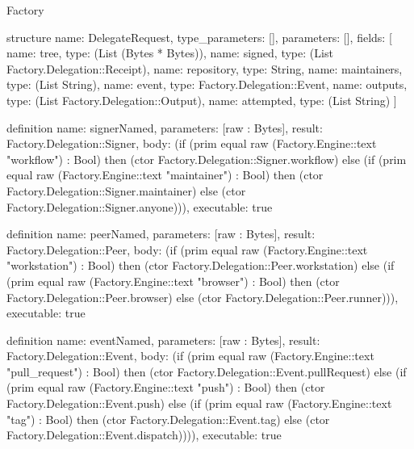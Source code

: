 \begin{lexlean}{Factory}
\begin{semanticmodule}
structure{
  name: DelegateRequest,
  type_parameters: [],
  parameters: [],
  fields: [
    {name: tree, type: (List (Bytes * Bytes))},
    {name: signed, type: (List Factory.Delegation::Receipt)},
    {name: repository, type: String},
    {name: maintainers, type: (List String)},
    {name: event, type: Factory.Delegation::Event},
    {name: outputs, type: (List Factory.Delegation::Output)},
    {name: attempted, type: (List String)}
  ]
}

definition{
  name: signerNamed,
  parameters: [raw : Bytes],
  result: Factory.Delegation::Signer,
  body: (if (prim equal raw (Factory.Engine::text "workflow") : Bool) then (ctor Factory.Delegation::Signer.workflow) else (if (prim equal raw (Factory.Engine::text "maintainer") : Bool) then (ctor Factory.Delegation::Signer.maintainer) else (ctor Factory.Delegation::Signer.anyone))),
  executable: true
}

definition{
  name: peerNamed,
  parameters: [raw : Bytes],
  result: Factory.Delegation::Peer,
  body: (if (prim equal raw (Factory.Engine::text "workstation") : Bool) then (ctor Factory.Delegation::Peer.workstation) else (if (prim equal raw (Factory.Engine::text "browser") : Bool) then (ctor Factory.Delegation::Peer.browser) else (ctor Factory.Delegation::Peer.runner))),
  executable: true
}

definition{
  name: eventNamed,
  parameters: [raw : Bytes],
  result: Factory.Delegation::Event,
  body: (if (prim equal raw (Factory.Engine::text "pull_request") : Bool) then (ctor Factory.Delegation::Event.pullRequest) else (if (prim equal raw (Factory.Engine::text "push") : Bool) then (ctor Factory.Delegation::Event.push) else (if (prim equal raw (Factory.Engine::text "tag") : Bool) then (ctor Factory.Delegation::Event.tag) else (ctor Factory.Delegation::Event.dispatch)))),
  executable: true
}


\end{semanticmodule}
\end{lexlean}
